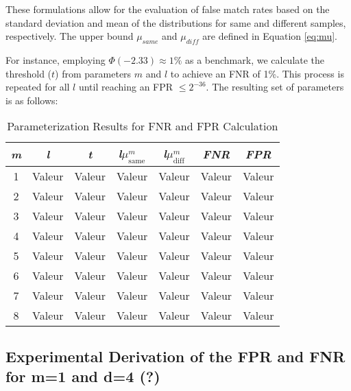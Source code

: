 These formulations allow for the evaluation of false match rates based on the standard deviation and mean of the distributions for same and different samples, respectively. The upper bound \(\mu_{same}\) and \(\mu_{diff}\) are defined in Equation \ref{eq:mu}.

For instance, employing \(\Phi(-2.33) \approx 1\%\) as a benchmark, we calculate the threshold (\(t\)) from parameters \(m\) and \(l\) to achieve an FNR of 1\%. This process is repeated for all \(l\) until reaching an FPR \(\leq 2^{-36} \). The resulting set of parameters is as follows: 

\begin{table}[htbp] 
    \centering
    \begin{tabular}{|c|c|c|c|c|c|c|}
        \hline
        \textit{m} & \textit{l} & \textit{t} & \textit{l}\(\mu_{\text{same}}^m\) & \textit{l}\(\mu_{\text{diff}}^m\) & \textit{FNR} & \textit{FPR} \\
        \hline
        1 & Valeur & Valeur & Valeur & Valeur & Valeur & Valeur \\
        2 & Valeur & Valeur & Valeur & Valeur & Valeur & Valeur \\
        3 & Valeur & Valeur & Valeur & Valeur & Valeur & Valeur \\
        4 & Valeur & Valeur & Valeur & Valeur & Valeur & Valeur \\
        5 & Valeur & Valeur & Valeur & Valeur & Valeur & Valeur \\
        6 & Valeur & Valeur & Valeur & Valeur & Valeur & Valeur \\
        7 & Valeur & Valeur & Valeur & Valeur & Valeur & Valeur \\
        8 & Valeur & Valeur & Valeur & Valeur & Valeur & Valeur \\
        \hline
    \end{tabular}
    \caption{Parameterization Results for FNR and FPR Calculation}
    \label{tab:parameterization}
\end{table}






\subsection{Experimental Derivation of the FPR and FNR for m=1 and d=4 (?)}